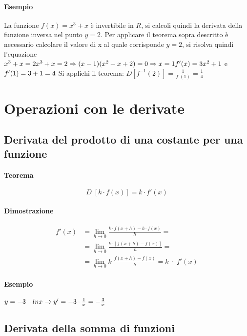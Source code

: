 \documentclass[a4paper,14pt]{extarticle}
\begin{document}
\paragraph{Esempio \\} La funzione $f(x)=x^3+x$ è invertibile in $R$, si calcoli quindi la derivata della funzione inversa nel punto $y=2$. Per applicare il teorema sopra descritto è necessario calcolare il valore di x al quale corrisponde $y=2$, si risolva quindi l'equazione $x^3+x=2\\x^3+x=2\Rightarrow(x-1)(x^2+x+2)=0\Rightarrow x=1 \\f'(x)=3x^2+1$ e $f'(1)=3+1=4 \\$ Si applichi il teorema: $D[f^{-1}(2)]=\frac{1}{f'(1)}=\frac{1}{4}$
\section{Operazioni con le derivate}
\subsection{Derivata del prodotto di una costante per una funzione}
\paragraph{Teorema \\} \[ D\;[k \cdot f(x)]= k \cdot f'(x) \]
\paragraph{Dimostrazione \\}
\large
\begin{equation} \label{eq_derivata_prodotto_costante_funzione}
\begin{split}
f'(x) & = \lim_{h\to0}\frac{k \cdot f(x+h)- k \cdot f(x)}{h} = \\ & =  \lim_{h\to0}\frac{k \cdot [f(x+h)- f(x)]}{h} = \\ & = \lim_{h\to0}k\;\frac{f(x+h)- f(x)}{h} =  k\;\cdot\;f'(x)
\end{split}
\end{equation}
\normalsize
\paragraph{Esempio \\} $\\ y=-3 \; \cdot ln x \xrightarrow{} y' = -3 \cdot \frac{1}{x}= -\frac{3}{x}$
\subsection{Derivata della somma di funzioni}
\end{document}
